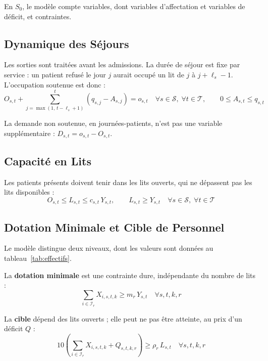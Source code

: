 En $S_0$, le modèle compte \NbVariables{} variables, dont \NbAffectations{} variables d'affectation et \NbDeficits{} variables de déficit, et \NbContraintes{} contraintes.

\subsection{Dynamique des Séjours}
Les sorties sont traitées avant les admissions. La durée de séjour est fixe par service : un patient refusé le jour $j$ aurait occupé un lit de $j$ à $j + \ell_s - 1$. L'occupation soutenue est donc :
\begin{equation}
    O_{s,t} + \sum_{j=\max(1,\,t-\ell_s+1)}^{t} \left(q_{s,j} - A_{s,j}\right) = o_{s,t}
    \quad \forall s \in \mathcal{S}, \; \forall t \in \mathcal{T}, \qquad 0 \le A_{s,t} \le q_{s,t}
\end{equation}

La demande non soutenue, en journées-patients, n'est pas une variable supplémentaire : $D_{s,t} = o_{s,t} - O_{s,t}$.

\subsection{Capacité en Lits}
Les patients présents doivent tenir dans les lits ouverts, qui ne dépassent pas les lits disponibles :
\begin{equation}
    O_{s,t} \le L_{s,t} \le c_{s,t} \, Y_{s,t}, \qquad L_{s,t} \ge Y_{s,t}
    \quad \forall s \in \mathcal{S}, \; \forall t \in \mathcal{T}
\end{equation}

\subsection{Dotation Minimale et Cible de Personnel}
Le modèle distingue deux niveaux, dont les valeurs sont données au tableau~\ref{tab:effectifs}.

La \textbf{dotation minimale} est une contrainte dure, indépendante du nombre de lits :
\begin{equation}
    \sum_{i \in \mathcal{I}_r} X_{i,s,t,k} \ge m_r \, Y_{s,t} \quad \forall s, t, k, r
\end{equation}

La \textbf{cible} dépend des lits ouverts ; elle peut ne pas être atteinte, au prix d'un déficit $Q$ :
\begin{equation}
    10 \left( \sum_{i \in \mathcal{I}_r} X_{i,s,t,k} + Q_{s,t,k,r} \right) \ge \rho_r \, L_{s,t} \quad \forall s, t, k, r
\end{equation}

